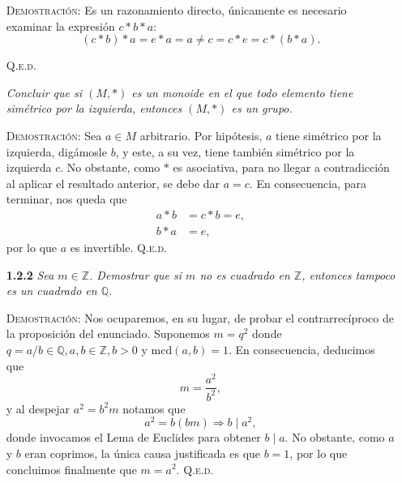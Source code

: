 \documentclass{article}
\newcommand{\mcd}{\text{mcd}}
\begin{document}
\begin{enumerate}
    \vspace{7px}

    \textsc{Demostración}: Es un razonamiento directo, únicamente es necesario examinar la expresión $c * b * a$: \[(c * b) * a = e * a = a \neq c = c * e = c * (b * a).\]

    \hfill{\textsc{Q.e.d.}}

    \vspace{7px}

    \newpage

    \textit{Concluir que si $(M, *)$ es un monoide en el que todo elemento tiene simétrico por la izquierda, entonces $(M, *)$ es un grupo.}

    \vspace{7px}

    \textsc{Demostración}: Sea $a \in M$ arbitrario. Por hipótesis, $a$ tiene simétrico por la izquierda, digámosle $b$, y este, a su vez, tiene también simétrico por la izquierda $c$. No obstante, como $*$ es asociativa, para no llegar a contradicción al aplicar el resultado anterior, se debe dar $a = c$. En consecuencia, para terminar, nos queda que
    \begin{equation*}
    \begin{split}
        a * b & = c * b = e, \\
        b * a & = e,
    \end{split}
    \end{equation*}
    por lo que $a$ es invertible. \hfill{\textsc{Q.e.d.}}

    \vspace{12px}

    \item[\textbf{1.2.2}] \textit{Sea $m \in \mathbb{Z}$. Demostrar que si $m$ no es cuadrado en $\mathbb{Z}$, entonces tampoco es un cuadrado en $\mathbb{Q}$.}

    \vspace{7px}

    \textsc{Demostración}: Nos ocuparemos, en su lugar, de probar el contrarrecíproco de la proposición del enunciado. Suponemos $m = q^2$ donde $q = a / b \in \mathbb{Q}, a, b \in \mathbb{Z}, b > 0$ y $\mcd(a, b) = 1$. En consecuencia, deducimos que \[m = \frac{a^2}{b^2},\] y al despejar $a^2 = b^2m$ notamos que \[a^2 = b(bm) \Longrightarrow b \mid a^2,\] donde invocamos el Lema de Euclides para obtener $b \mid a$. No obstante, como $a$ y $b$ eran coprimos, la única causa justificada es que $b = 1$, por lo que concluimos finalmente que $m = a^2$. \hfill{\textsc{Q.e.d.}}


\end{enumerate}
\end{document}
